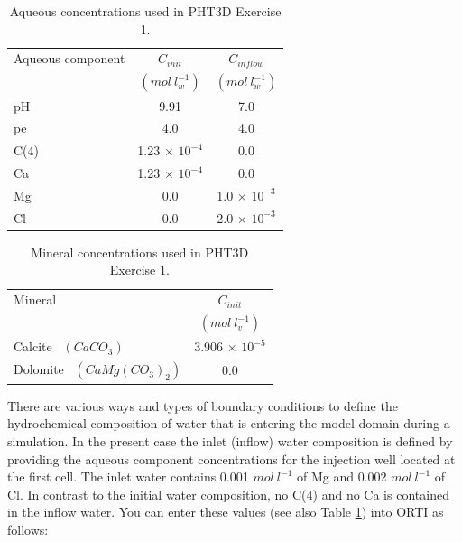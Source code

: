 \begin{table}[hb]
\caption{Aqueous concentrations used in PHT3D Exercise 1.}
\begin{center}
\begin{tabular}{l c c}
\hline
 Aqueous component       & $C_{init}$ & $C_{inflow}$      \\
                & $(mol\ l^{-1}_w)$   & $(mol\ l^{-1}_w)$      \\ \hline
 pH             &   9.91    &  7.0            \\
 pe             &   4.0     &  4.0            \\
 C(4)           &  1.23 $\times$ $10^{-4}$ &   $  0.0  $              \\
 Ca             &  1.23 $\times$ $10^{-4}$ &   $  0.0  $               \\
 Mg             &     0.0                  & 1.0 $\times$ $10^{-3}$   \\
 Cl             &     0.0                  & 2.0 $\times$ $10^{-3}$   \\ \hline
\end{tabular}
\label{ex2_caqu}
\end{center}
\end{table}

\begin{table}[hb]
\caption{Mineral concentrations used in PHT3D Exercise 1.}
\begin{center}
\begin{tabular}{ l c }
\hline
 Mineral        & $C_{init}$  \\
                  & $(mol\ l^{-1}_{v})$  \\ \hline
 Calcite \   $(CaCO_3)  $  & 3.906 $\times$ $10^{-5}$  \\
 Dolomite  \ $(CaMg(CO_3)_2) $  &   0.0             \\ \hline
\end{tabular}
\label{ex2_cmin}
\end{center}
\end{table}


There are various ways and types of boundary conditions to define the hydrochemical
composition of water that is entering the model domain during a simulation.
In the present case the inlet (inflow) water composition is defined by providing the 
aqueous component concentrations for the injection well located at the first cell. The inlet water contains 0.001 $mol\ l^{-1}$ of Mg and 0.002 $mol\ l^{-1}$ of Cl. In contrast to the initial water composition, no C(4) and no Ca is contained in the inflow water. 
You can enter these values (see also Table \ref{ex2_caqu}) into ORTI as follows: \\


